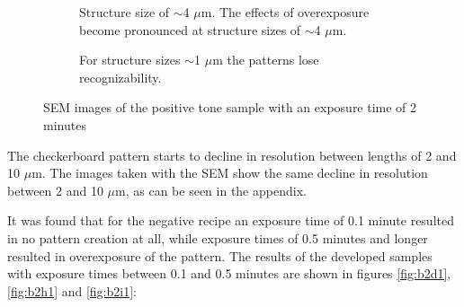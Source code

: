 \begin{figure}[ht]
\begin{subfigure}[t]{0.24\linewidth}
	\caption{Structure size of $\sim$4 $\mu$m. The effects of overexposure become pronounced at structure sizes of $\sim$4 $\mu$m.}
	\label{fig:b2d9_q9}
\end{subfigure}
\hfill
    \begin{subfigure}[t]{0.24\linewidth}
	\centering
	\caption{For structure sizes $\sim$1 $\mu$m the patterns lose recognizability.}
	\label{fig:b2d10_q11}
\end{subfigure}
\caption{SEM images of the positive tone sample with an exposure time of 2 minutes}
\end{figure}

The checkerboard pattern starts to decline in resolution between lengths of 2 and 10 $\mu$m. The images taken with the SEM show the same decline in resolution between 2 and 10 $\mu$m, as can be seen in the appendix.


It was found that for the negative recipe an exposure time of 0.1 minute resulted in no pattern creation at all, while exposure times of 0.5 minutes and longer resulted in overexposure of the pattern. The results of the developed samples with exposure times between 0.1 and 0.5 minutes are shown in figures \ref{fig:b2d1}, \ref{fig:b2h1} and \ref{fig:b2i1}:


